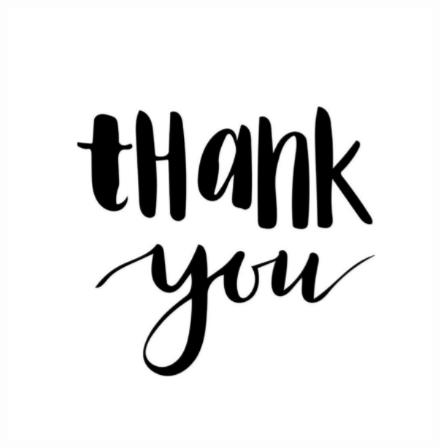 \documentclass{beamer}
\begin{document}
\begin{frame}
\begin{figure}
	\centering
	\includegraphics[height=0.6\textheight]{images/Theend}
\end{figure}
\end{frame}
\end{document}
